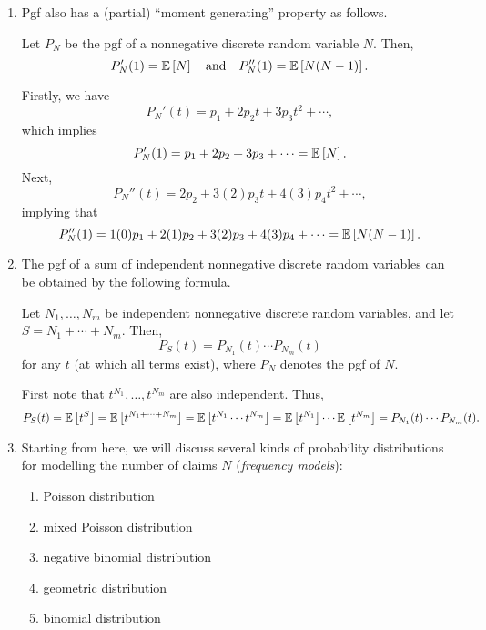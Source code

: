 \begin{enumerate}
\item Pgf also has a (partial) ``moment generating'' property as follows.
\begin{proposition}
\label{prp:pgf-gen-mom}
Let \(P_N\) be the pgf of a nonnegative discrete random variable \(N\).  Then,
\[
P_N'(1)=\expv{N}\qqtext{and}P_N''(1)=\expv{N(N-1)}.
\]
\end{proposition}
\begin{pf}
Firstly, we have
\[
P_N'(t)=p_1+2p_2t+3p_3t^2+\dotsb,
\]
which implies
\[
P_N'(1)=p_1+2p_2+3p_3+\dotsb=\mathbb{E}\left[N\right].
\]
Next,
\[
P_N''(t)=2p_2+3(2)p_3t+4(3)p_4t^2+\dotsb,
\]
implying that
\[
P_N''(1)=1(0)p_1+2(1)p_2+3(2)p_3+4(3)p_4+\dotsb=\mathbb{E}\left[N(N-1)\right].
\]
\end{pf}
\item The pgf of a sum of independent nonnegative discrete random variables can
be obtained by the following formula.
\begin{proposition}
\label{prp:pgf-sum}
Let \(N_1,\dotsc,N_m\) be independent nonnegative discrete random variables,
and let \(S=N_1+\dotsb+N_m\). Then,
\[
P_S(t)=P_{N_1}(t)\dotsb P_{N_m}(t)
\]
for any \(t\) (at which all terms exist), where \(P_N\) denotes the pgf of
\(N\).
\end{proposition}
\begin{pf}
First note that \(t^{N_1},\dotsc,t^{N_m}\) are also independent. Thus,
\[
P_S(t)=\mathbb{E}\left[t^S\right]=\mathbb{E}\left[t^{N_1+\dotsb+N_m}\right]
=\mathbb{E}\left[t^{N_1}\dotsb t^{N_m}\right]
=\mathbb{E}\left[t^{N_1}\right]\dotsb\mathbb{E}\left[t^{N_m}\right]
=P_{N_1}(t)\dotsb P_{N_m}(t).
\]
\end{pf}
\item Starting from here, we will discuss several kinds of probability
distributions for modelling the number of claims \(N\) (\emph{frequency
models}):
\begin{enumerate}
\item Poisson distribution
\item mixed Poisson distribution
\item negative binomial distribution
\item geometric distribution
\item binomial distribution
\end{enumerate}
\end{enumerate}
